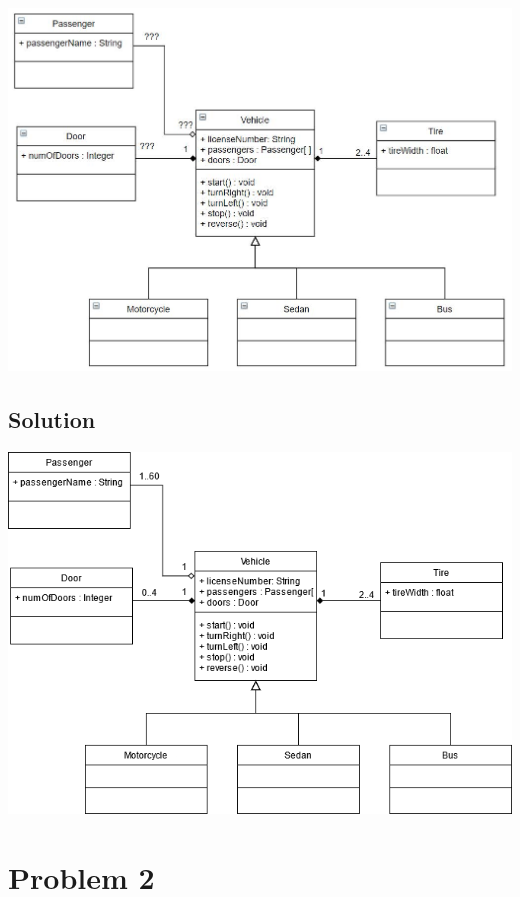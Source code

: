 \documentclass{article}
\begin{document}
    \begin{center}
        \includegraphics[scale=0.75]{Exercise 03_ Practice Problems.jpg}
    \end{center}

    \subsection*{Solution}

    \begin{center}
        \includegraphics[scale=0.55]{E3_Q1.png}
    \end{center}


    \section*{Problem 2}
\end{document}
